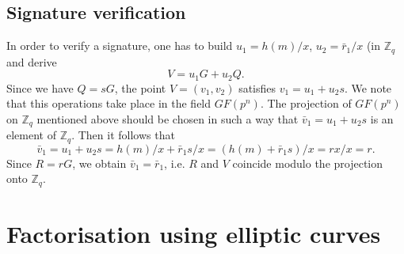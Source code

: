 \par
\subsection{Signature verification}

In order to verify a signature, one has to build $u_1=h(m)/x$, $u_2=\bar r_1/x$ (in ${\mathbb Z}_q$ and derive
$$ V=u_1G+u_2Q .
$$
Since we have $Q=sG$, the point $V=(v_1,v_2)$ satisfies $v_1=u_1+u_2s$. We note that this operations take place in the field $GF(p^n)$. The projection of $GF(p^n)$ on ${\mathbb Z}_q$ mentioned above should be chosen in such a way that $\bar v_1=u_1+u_2s$ is an element of ${\mathbb Z}_q$. Then it follows that
$$ \bar v_1=u_1+u_2s=h(m)/x+\bar r_1 s/x=(h(m)+\bar r_1s)/x=rx/x=r .
$$
Since $R=rG$, we obtain $\bar v_1=\bar r_1$, i.e. $R$ and $V$ coincide modulo the projection onto ${\mathbb Z}_q$.


\hypertarget{faktell}{}
\section{Factorisation using elliptic curves} \label{ECC-Factorisation}

